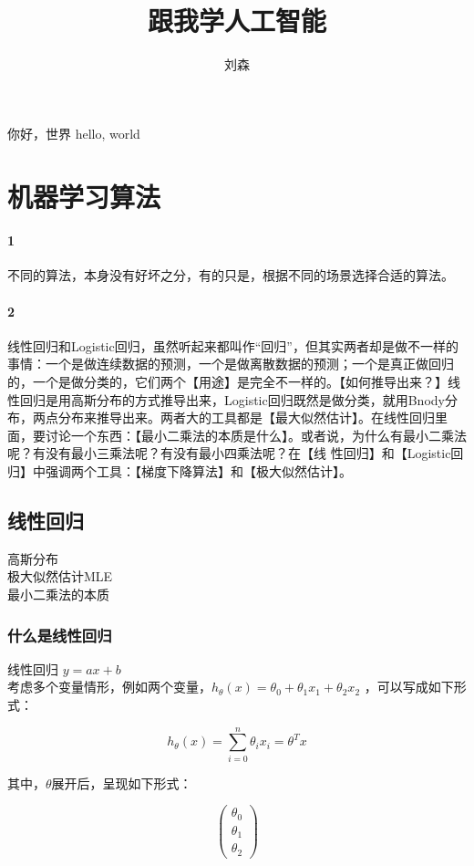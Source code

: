 \documentclass[UTF8]{ctexart}
\author{刘森}
\title{跟我学人工智能}
\begin{document}
    \maketitle
你好，世界 hello, world %

\section{机器学习算法}
\paragraph{1} 不同的算法，本身没有好坏之分，有的只是，根据不同的场景选择合适的算法。
\paragraph{2} 线性回归和Logistic回归，虽然听起来都叫作“回归”，但其实两者却是做不一样的事情：一个是做连续数据的预测，一个是做离散数据的预测；一个是真正做回归的，一个是做分类的，它们两个【用途】是完全不一样的。【如何推导出来？】线性回归是用高斯分布的方式推导出来，Logistic回归既然是做分类，就用Bnody分布，两点分布来推导出来。两者大的工具都是【最大似然估计】。在线性回归里面，要讨论一个东西：【最小二乘法的本质是什么】。或者说，为什么有最小二乘法呢？有没有最小三乘法呢？有没有最小四乘法呢？在【线 性回归】和【Logistic回归】中强调两个工具：【梯度下降算法】和【极大似然估计】。
    
\subsection{线性回归}
高斯分布 \\ 极大似然估计MLE \\ 最小二乘法的本质 \\

\subsubsection{什么是线性回归}
线性回归
$y=ax+b$\\

考虑多个变量情形，例如两个变量，$h_{\theta}(x)=\theta_{0}+\theta_{1}x_{1}+\theta_{2}x_{2}$ ，可以写成如下形式：

\begin{displaymath}
h_{\theta}(x)=\sum_{i=0}^{n}\theta_{i}x_{i}=\theta^{T}x
\end{displaymath}

其中，$\theta$展开后，呈现如下形式：

\[ \left( \begin{array}{c}
\theta_{0} \\
\theta_{1} \\
\theta_{2} \end{array} \right)\]
\end{document}
